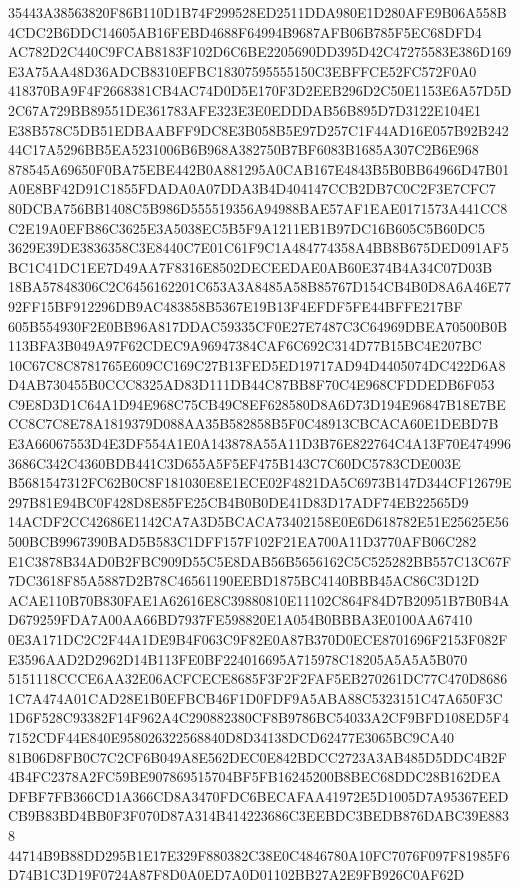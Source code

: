 \documentclass[UTF8,fontset=fandol,zihao=-4,a4paper]{ctexart}
\begin{document}
{{35443A38563820F86B110D1B74F299528ED2511DDA980E1D280AFE9B06A558B4CDC2B6DDC14605AB16FEBD4688F64994B9687AFB06B785F5EC68DFD4
AC782D2C440C9FCAB8183F102D6C6BE2205690DD395D42C47275583E386D169E3A75AA48D36ADCB8310EFBC18307595555150C3EBFFCE52FC572F0A0
418370BA9F4F2668381CB4AC74D0D5E170F3D2EEB296D2C50E1153E6A57D5D2C67A729BB89551DE361783AFE323E3E0EDDDAB56B895D7D3122E104E1
E38B578C5DB51EDBAABFF9DC8E3B058B5E97D257C1F44AD16E057B92B24244C17A5296BB5EA5231006B6B968A382750B7BF6083B1685A307C2B6E968
878545A69650F0BA75EBE442B0A881295A0CAB167E4843B5B0BB64966D47B01A0E8BF42D91C1855FDADA0A07DDA3B4D404147CCB2DB7C0C2F3E7CFC7
80DCBA756BB1408C5B986D555519356A94988BAE57AF1EAE0171573A441CC8C2E19A0EFB86C3625E3A5038EC5B5F9A1211EB1B97DC16B605C5B60DC5
3629E39DE3836358C3E8440C7E01C61F9C1A484774358A4BB8B675DED091AF5BC1C41DC1EE7D49AA7F8316E8502DECEEDAE0AB60E374B4A34C07D03B
18BA57848306C2C6456162201C653A3A8485A58B85767D154CB4B0D8A6A46E7792FF15BF912296DB9AC483858B5367E19B13F4EFDF5FE44BFFE217BF
605B554930F2E0BB96A817DDAC59335CF0E27E7487C3C64969DBEA70500B0B113BFA3B049A97F62CDEC9A96947384CAF6C692C314D77B15BC4E207BC
10C67C8C8781765E609CC169C27B13FED5ED19717AD94D4405074DC422D6A8D4AB730455B0CCC8325AD83D111DB44C87BB8F70C4E968CFDDEDB6F053
C9E8D3D1C64A1D94E968C75CB49C8EF628580D8A6D73D194E96847B18E7BECC8C7C8E78A1819379D088AA35B582858B5F0C48913CBCACA60E1DEBD7B
E3A66067553D4E3DF554A1E0A143878A55A11D3B76E822764C4A13F70E4749963686C342C4360BDB441C3D655A5F5EF475B143C7C60DC5783CDE003E
B5681547312FC62B0C8F181030E8E1ECE02F4821DA5C6973B147D344CF12679E297B81E94BC0F428D8E85FE25CB4B0B0DE41D83D17ADF74EB22565D9
14ACDF2CC42686E1142CA7A3D5BCACA73402158E0E6D618782E51E25625E56500BCB9967390BAD5B583C1DFF157F102F21EA700A11D3770AFB06C282
E1C3878B34AD0B2FBC909D55C5E8DAB56B5656162C5C525282BB557C13C67F7DC3618F85A5887D2B78C46561190EEBD1875BC4140BBB45AC86C3D12D
ACAE110B70B830FAE1A62616E8C39880810E11102C864F84D7B20951B7B0B4AD679259FDA7A00AA66BD7937FE598820E1A054B0BBBA3E0100AA67410
0E3A171DC2C2F44A1DE9B4F063C9F82E0A87B370D0ECE8701696F2153F082FE3596AAD2D2962D14B113FE0BF224016695A715978C18205A5A5A5B070
5151118CCCE6AA32E06ACFCECE8685F3F2F2FAF5EB270261DC77C470D86861C7A474A01CAD28E1B0EFBCB46F1D0FDF9A5ABA88C5323151C47A650F3C
1D6F528C93382F14F962A4C290882380CF8B9786BC54033A2CF9BFD108ED5F47152CDF44E840E958026322568840D8D34138DCD62477E3065BC9CA40
81B06D8FB0C7C2CF6B049A8E562DEC0E842BDCC2723A3AB485D5DDC4B2F4B4FC2378A2FC59BE907869515704BF5FB16245200B8BEC68DDC28B162DEA
DFBF7FB366CD1A366CD8A3470FDC6BECAFAA41972E5D1005D7A95367EEDCB9B83BD4BB0F3F070D87A314B414223686C3EEBDC3BEDB876DABC39E8838
44714B9B88DD295B1E17E329F880382C38E0C4846780A10FC7076F097F81985F6D74B1C3D19F0724A87F8D0A0ED7A0D01102BB27A2E9FB926C0AF62D
}}
\end{document}

